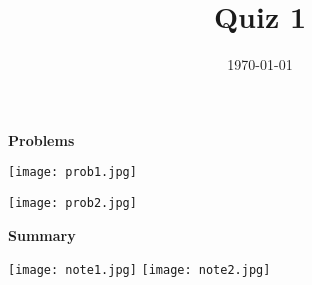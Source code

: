 \documentclass{homework}
\title{Quiz 1}
\date{\today}
\begin{document}
\maketitle
\setlength{\parindent}{0pt}
\vspace*{-0.8cm}
{\Large\bf Problems}

\begin{center}
    \texttt{[image: prob1.jpg]}
\end{center}
\newpage
\texttt{[image: prob2.jpg]}
\newpage

\vspace*{-0.5cm}
{\Large\bf Summary}

\texttt{[image: note1.jpg]}
\texttt{[image: note2.jpg]}
\end{document}
